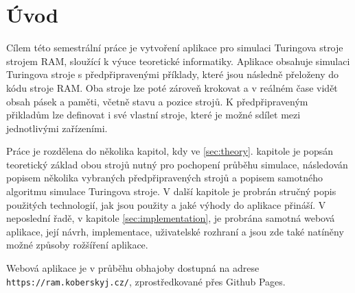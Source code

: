 \chapter{Úvod}
\label{sec:Introduction}
Cílem této semestrální práce je vytvoření aplikace pro simulaci Turingova stroje strojem RAM, sloužící k výuce teoretické informatiky. 
Aplikace obsahuje simulaci Turingova stroje s předpřipravenými příklady, které jsou následně přeloženy do kódu stroje RAM. 
Oba stroje lze poté zároveň krokovat a v reálném čase vidět obsah pásek a paměti, včetně stavu a pozice strojů. 
K předpřipraveným přikladům lze definovat i své vlastní stroje, které je možné sdílet mezi jednotlivými zařízeními.

Práce je rozdělena do několika kapitol, kdy ve \ref{sec:theory}. kapitole je popsán teoretický základ obou strojů nutný pro pochopení průběhu simulace, 
následován popisem několika vybraných předpřipravených strojů a popisem samotného algoritmu simulace Turingova stroje. 
V další kapitole je probrán stručný popis použitých technologií, jak jsou použity a jaké výhody do aplikace přináší.
V neposlední řadě, v kapitole \ref{sec:implementation}, je probrána samotná webová aplikace, její návrh, implementace, uživatelské rozhraní a jsou zde také natíněny možné způsoby rožšíření aplikace.

Webová aplikace je v průběhu obhajoby dostupná na adrese \texttt{https://ram.koberskyj.cz/}, zprostředkované přes Github Pages. %
\endinput